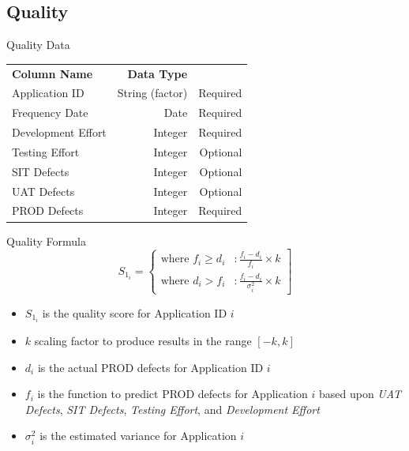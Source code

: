     \subsection{Quality}
        \begin{frame}{Quality Data}
            \centering
            \begin{tabular}{l | r | r}
                 {\bfseries Column Name}
                 & {\bfseries Data Type}
                 &  \\
                
                Application ID & String (factor) & Required \\
                \myrowcolour%
                Frequency Date & Date & Required \\
                Development Effort & Integer & Required \\
                \myrowcolour%
                Testing Effort & Integer & Optional \\ 
                SIT Defects & Integer & Optional \\ 
                \myrowcolour%
                UAT Defects & Integer  & Optional \\ 
                PROD Defects & Integer  & Required \\
                
            \end{tabular}
        \end{frame} 
        \begin{frame}{Quality Formula}
            \begin{displaymath}
               S_{1_i} = \left\{
                 \begin{array}{lr}
                   \text{where } f_i \geq d_i & :  \frac{f_i - d_i}{f_i} \times k  \\
                   \text{where } d_i > f_i  & : \frac{f_i-d_i }{\sigma_i^2} \times k
                 \end{array}
               \right] 
            \end{displaymath} 
            
            \begin{itemize}
                \item $S_{1_i}$ is the quality score for Application ID $i$
                \item $k$ scaling factor to produce results in the range $[-k,k]$
                \item $d_i$ is the actual PROD defects for Application ID $i$
                \item $f_i$ is the function to predict PROD defects for Application $i$ based upon 
                    \textit{UAT Defects}, \textit{SIT Defects}, \textit{Testing Effort}, 
                    and \textit{Development Effort}
                \item $\sigma_i^2$ is the estimated variance for Application $i$
            \end{itemize}
        \end{frame} 
